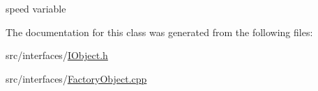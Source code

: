speed variable 



The documentation for this class was generated from the following files\+:\begin{DoxyCompactItemize}
\item 
src/interfaces/\hyperlink{_i_object_8h}{I\+Object.\+h}\item 
src/interfaces/\hyperlink{_factory_object_8cpp}{Factory\+Object.\+cpp}\end{DoxyCompactItemize}
